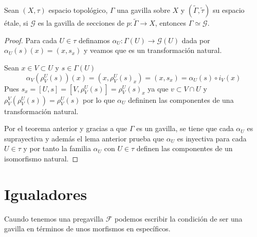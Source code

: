\documentclass[14pt]{extarticle}
\begin{document}
\begin{teorema}{}{}
    Sean $(X,\tau)$ espacio topológico, 
    $\Gamma$ una gavilla sobre $X$ y 
    $(\widetilde{\Gamma},\tilde{\tau})$ su espacio étale,
    si $\mathcal{G}$ es la gavilla de secciones
    de $p:\widetilde{\Gamma}\rightarrow X$, entonces
    $\Gamma \simeq \mathcal{G}$.
\end{teorema}
\begin{proof}
    Para cada $U\in \tau$ definamos
    $\alpha_U:\Gamma(U)\rightarrow \mathcal{G}(U)$
    dada por $\alpha_U(s)(x)=(x,s_x)$ y veamos que 
    es un transformación natural.

    Sean $x\in V\subset U$ y $s\in \Gamma(U)$
    $$\alpha_V(\rho_{V}^{U}(s))(x)
    =(x, \rho_{V}^{U}(s)_x)
    =(x,s_x)=\alpha_U(s)\circ i_V (x)$$
    Pues $s_x=[U,s]=[V,\rho_{V}^{U}(s)]=\rho_{V}^{U}(s)_x$
    ya que $v\subset V\cap U$ y $\rho_{V}^{V}(\rho_{V}^{U}(s))=\rho_{V}^{U}(s)$
    por lo que $\alpha_U$ defininen las componentes de una transformación
    natural.

    Por el teorema anterior y gracias a que 
    $\Gamma$ es un gavilla, se tiene que cada 
    $\alpha_U$ es suprayectiva y además el lema anterior prueba que 
    $\alpha_U$ es inyectiva para cada 
    $U\in \tau$ y por tanto la familia $\alpha_U$ con
    $U\in \tau$ definen las componentes 
    de un isomorfismo natural.
\end{proof}

\section{Igualadores}

Caundo tenemos una pregavilla $\mathcal{F}$
podemos escribir la condición de ser una
gavilla en términos de unos morfismos en 
específicos.
\end{document}
